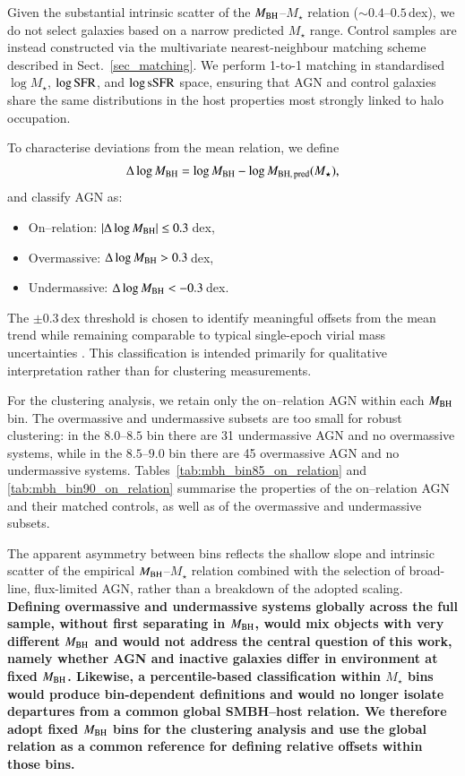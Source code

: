 \documentclass{aa}
\begin{document}
Given the substantial intrinsic scatter of the $M_{\rm BH}$--$M_\star$ relation ($\sim0.4$--$0.5$\,dex), we do not select galaxies based on a narrow predicted $M_\star$ range. Control samples are instead constructed via the multivariate nearest-neighbour matching scheme described in Sect.~\ref{sec_matching}. We perform 1-to-1 matching in standardised $\log M_\star$, $\log {\rm SFR}$, and $\log {\rm sSFR}$ space, ensuring that AGN and control galaxies share the same distributions in the host properties most strongly linked to halo occupation.

To characterise deviations from the mean relation, we define
\[
\Delta \log M_{\rm BH} =
\log M_{\rm BH} - \log M_{\rm BH,\,pred}(M_\star),
\]
and classify AGN as:
\begin{itemize}
\item On--relation: $|\Delta \log M_{\rm BH}| \le 0.3$\,dex,
\item Overmassive: $\Delta \log M_{\rm BH} > 0.3$\,dex,
\item Undermassive: $\Delta \log M_{\rm BH} < -0.3$\,dex.
\end{itemize}

The $\pm0.3$\,dex threshold is chosen to identify meaningful offsets from the mean trend while remaining comparable to typical single-epoch virial mass uncertainties \citep[e.g.][]{VestergaardPeterson2006, Shen2011}. This classification is intended primarily for qualitative interpretation rather than for clustering measurements.

For the clustering analysis, we retain only the on--relation AGN within each $M_{\rm BH}$ bin. The overmassive and undermassive subsets are too small for robust clustering: in the $8.0$--$8.5$ bin there are 31 undermassive AGN and no overmassive systems, while in the $8.5$--$9.0$ bin there are 45 overmassive AGN and no undermassive systems. Tables~\ref{tab:mbh_bin85_on_relation} and \ref{tab:mbh_bin90_on_relation} summarise the properties of the on--relation AGN and their matched controls, as well as of the overmassive and undermassive subsets.

The apparent asymmetry between bins reflects the shallow slope and intrinsic scatter of the empirical $M_{\rm BH}$--$M_\star$ relation combined with the selection of broad-line, flux-limited AGN, rather than a breakdown of the adopted scaling. \textbf{Defining overmassive and undermassive systems globally across the full sample, without first separating in $M_{\rm BH}$, would mix objects with very different $M_{\rm BH}$ and would not address the central question of this work, namely whether AGN and inactive galaxies differ in environment at fixed $M_{\rm BH}$. Likewise, a percentile-based classification within $M_\star$ bins would produce bin-dependent definitions and would no longer isolate departures from a common global SMBH--host relation. We therefore adopt fixed $M_{\rm BH}$ bins for the clustering analysis and use the global relation as a common reference for defining relative offsets within those bins.}
\end{document}
